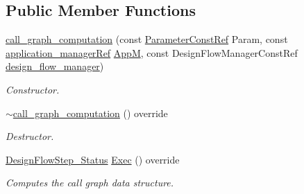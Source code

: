 \subsection*{Public Member Functions}
\begin{DoxyCompactItemize}
\item 
\hyperlink{classcall__graph__computation_a91e8b90eb5bc3b1b9db1b9487cd51f9b}{call\+\_\+graph\+\_\+computation} (const \hyperlink{Parameter_8hpp_a37841774a6fcb479b597fdf8955eb4ea}{Parameter\+Const\+Ref} Param, const \hyperlink{application__manager_8hpp_a04ccad4e5ee401e8934306672082c180}{application\+\_\+manager\+Ref} \hyperlink{classFrontendFlowStep_a0ac0d8db2a378416583f51c4faa59d15}{AppM}, const Design\+Flow\+Manager\+Const\+Ref \hyperlink{classDesignFlowStep_ab770677ddf087613add30024e16a5554}{design\+\_\+flow\+\_\+manager})
\begin{DoxyCompactList}\small\item\em Constructor. \end{DoxyCompactList}\item 
\hyperlink{classcall__graph__computation_a47744b276b33fb2f3a223cad69a218ac}{$\sim$call\+\_\+graph\+\_\+computation} () override
\begin{DoxyCompactList}\small\item\em Destructor. \end{DoxyCompactList}\item 
\hyperlink{design__flow__step_8hpp_afb1f0d73069c26076b8d31dbc8ebecdf}{Design\+Flow\+Step\+\_\+\+Status} \hyperlink{classcall__graph__computation_a59dbe3059afb5101f03f746b52e49d0e}{Exec} () override
\begin{DoxyCompactList}\small\item\em Computes the call graph data structure. \end{DoxyCompactList}\end{DoxyCompactItemize}

